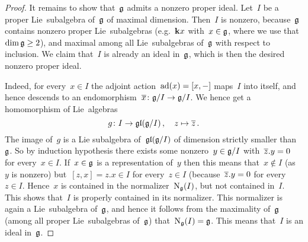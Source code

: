 \begin{proof}
  It remains to show that~$\mathfrak{g}$ admits a nonzero proper ideal.
  Let~$I$ be a proper Lie~subalgebra of~$\mathfrak{g}$ of maximal dimension.
  Then~$I$ is nonzero, because~$\mathfrak{g}$ contains nonzero proper Lie~subalgebras (e.g.~$\mathbf{k} x$ with~$x \in \mathfrak{g}$, where we use that~$\dim \mathfrak{g} \geq 2$), and maximal among all Lie~subalgebras of~$\mathfrak{g}$ with respect to inclusion.
  We claim that~$I$ is already an ideal in~$\mathfrak{g}$, which is then the desired nonzero proper ideal.
  
  Indeed, for every~$x \in I$ the adjoint action~$\operatorname{ad}(x) = [x,-]$ maps~$I$ into itself, and hence descends to an endomorphism~$\overline{x} \colon \mathfrak{g}/I \to \mathfrak{g}/I$.
  We hence get a homomorphism of Lie~algebras
  \[
    g
    \colon
    I
    \to
    \mathfrak{gl}(\mathfrak{g}/I)  \,,
    \quad
    z
    \mapsto
    \overline{z} \,.
  \]
  The image of~$g$ is a Lie subalgebra of~$\mathfrak{gl}(\mathfrak{g}/I)$ of dimension strictly smaller than~$\mathfrak{g}$.
  So by induction hypothesis there exists some nonzero~$y \in \mathfrak{g}/I$ with~$\overline{z}.y = 0$ for every~$x \in I$.
  If~$x \in \mathfrak{g}$ is a representation of~$y$ then this means that~$x \notin I$ (as~$y$ is nonzero) but~$[z,x] = z.x \in I$ for every~$z \in I$ (because~$\overline{z}.y = 0$ for every~$z \in I$.
  Hence~$x$ is contained in the normalizer~$\operatorname{N}_{\mathfrak{g}}(I)$, but not contained in~$I$.
  This shows that~$I$ is properly contained in its normalizer.
  This normalizer is again a Lie~subalgebra of~$\mathfrak{g}$, and hence it follows from the maximality of~$\mathfrak{g}$ (among all proper Lie~subalgebras of~$\mathfrak{g}$) that~$\operatorname{N}_{\mathfrak{g}}(I) = \mathfrak{g}$.
  This means that~$I$ is an ideal in~$\mathfrak{g}$.
\end{proof}


